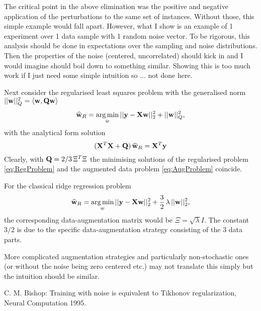 The critical point in the above elimination was the positive and negative application of the perturbations to the same set of instances. Without those, this simple example would fall apart.
However, what I show is an example of 1 experiment over 1 data sample with 1 random noise vector.
To be rigorous, this analysis should be done in expectations over the sampling and noise distributions. Then the properties of the noise (centered, uncorrelated) should kick in and I would imagine should boil down to something similar. Showing this is too much work if I just need some simple intuition so ... not done here.

Next consider the regularised least squares problem with the generalised norm $||\mathbf{w}||^2_Q = \langle \mathbf{w} , \mathbf{Q} \mathbf{w} \rangle$
\begin{equation}\label{eq:RegProblem}
\mathbf{\widehat{w}}_R = \operatorname*{arg\,min}_w ||\mathbf{y} - \mathbf{X}\mathbf{w}||_2^2 + ||\mathbf{w}||^2_Q,
\end{equation}
with the analytical form solution 
\begin{equation}\label{eq:RegSolutoin}
( \mathbf{X}^T \mathbf{X} + \mathbf{Q}) \, \mathbf{\widehat{w}}_R =  \mathbf{X}^T \mathbf{y}
\end{equation}
Clearly, with $\mathbf{Q} = 2/3 \, \Xi^T\Xi$ the minimising solutions of the regularised problem \eqref{eq:RegProblem} and the augmented data problem \eqref{eq:AugProblem} coincide.

For the classical ridge regression problem
\begin{equation}
\mathbf{\widehat{w}}_R = \operatorname*{arg\,min}_w ||\mathbf{y} - \mathbf{X}\mathbf{w}||_2^2 + \frac{3}{2} \, \lambda \, ||\mathbf{w}||_2^2,
\end{equation}
the corresponding data-augmentation matrix would be $\Xi = \sqrt{\lambda} I$. The constant $3/2$ is due to the specific data-augmentation strategy consisting of the 3 data parts.

More complicated augmentation strategies and particularly non-stochastic ones (or without the noise being zero centered etc.) may not translate this simply but the intuition should be similar.


\begin{thebibliography}{9}

C. M. Bishop: Training with noise is equivalent to Tikhonov regularization, Neural Computation 1995.

\end{thebibliography}
